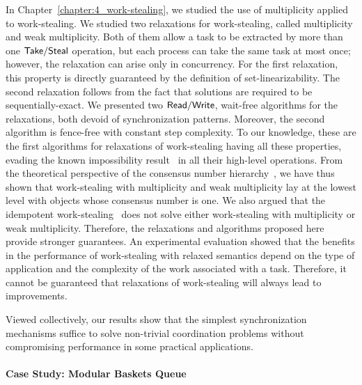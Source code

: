 In Chapter~\ref{chapter:4_work-stealing}, we studied the use of multiplicity applied to work-stealing. We studied two relaxations for work-stealing, called multiplicity and weak multiplicity. Both of them allow a task to be extracted by more than one ${\sf Take}/{\sf Steal}$ operation, but each process can take the same task at most once; however, the relaxation can arise only in concurrency. For the first relaxation, this property is directly guaranteed by the definition of set-linearizability. The second relaxation follows from the fact that solutions are required to be sequentially-exact. We presented two ${\sf Read}/{\sf Write}$, wait-free algorithms for the relaxations, both devoid of \RAW synchronization patterns.
Moreover, the second algorithm is fence-free with constant step complexity. To our knowledge, these are the first algorithms for relaxations of work-stealing having all these properties, evading the known impossibility result~\cite{DBLP_conf_popl_AttiyaGHKMV11} in all their high-level operations. From the theoretical perspective of the consensus number hierarchy~\cite{DBLP_journals_toplas_Herlihy91}, we have thus shown that work-stealing with multiplicity and weak multiplicity lay at the lowest level with objects whose consensus number is one. We also argued that the idempotent work-stealing~\cite{maged.vechev.2009} does not solve either work-stealing with multiplicity or weak multiplicity. Therefore, the relaxations and algorithms proposed here provide stronger guarantees. An experimental evaluation showed that the benefits in the performance of work-stealing with relaxed semantics depend on the type of application and the complexity of the work associated with a task. Therefore, it cannot be guaranteed that relaxations of work-stealing will always lead to improvements.

Viewed collectively, our results show that the simplest synchronization mechanisms suffice to solve non-trivial coordination problems without compromising performance in some practical applications.

\paragraph{Case Study: Modular Baskets Queue}

